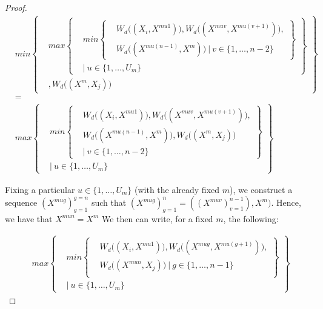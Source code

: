 \documentclass{article} %
\begin{document}
\begin{proof}
\[
\begin{aligned}
&min
      \left\{
      \begin{aligned}
        &max
          \left\{
          \begin{aligned}
            &min\left\{
            \begin{aligned}
            &W_d\big((X_i,X^{mu1})\big), W_d\big((X^{muv},X^{mu(v+1)})\big), \\
            &W_d\big((X^{mu(n-1)},X^m)\big)\ |\ v\in\{1,\ldots,n-2\}
            \end{aligned}
            \right\} \\
            &|\ u\in\{1,\ldots,U_m\}
          \end{aligned}
          \right\} \\
          &, W_d\big((X^m,X_j)\big)
      \end{aligned}
      \right\} \\
      &= \\
&max
          \left\{
          \begin{aligned}
            &min\left\{
            \begin{aligned}
            &W_d\big((X_i,X^{mu1})\big), W_d\big((X^{muv},X^{mu(v+1)})\big), \\
            &W_d\big((X^{mu(n-1)},X^m)\big), W_d\big((X^m,X_j)\big)\ \\
            &|\ v\in\{1,\ldots,n-2\}
            \end{aligned}
            \right\} \\
            &|\ u\in\{1,\ldots,U_m\}
          \end{aligned}
          \right\}
\end{aligned}
\]

Fixing a particular $u\in\{1,\ldots,U_m\}$ (with the already fixed $m$), we construct a sequence $(X^{mug})_{g=1}^{g=n}$ such that $(X^{mug})_{g=1}^n=((X^{muv})_{v=1}^{n-1}),X^m)$. Hence, we have that $X^{mun}=X^m$ We then can write, for a fixed $m$, the following:

\[
\begin{aligned}
&max
          \left\{
          \begin{aligned}
            &min\left\{
            \begin{aligned}
            &W_d\big((X_i,X^{mu1})\big), W_d\big((X^{mug},X^{mu(g+1)})\big), \\
            &W_d\big((X^{mun},X_j)\big)\ |\ g\in\{1,\ldots,n-1\}\\
            \end{aligned}
            \right\} \\
            &|\ u\in\{1,\ldots,U_m\}
          \end{aligned}
          \right\}
\end{aligned}
\]




\end{proof}
\end{document}

